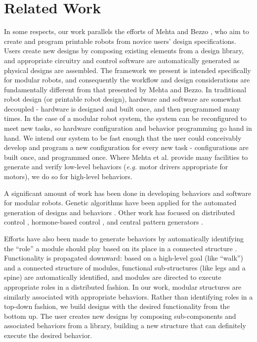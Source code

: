 \documentclass[graybox]{svmult}
\begin{document}
\section{Related Work} \label{sec:related-work} 
In some respects, our work parallels the efforts of Mehta \cite{mehta2014design}
and Bezzo \cite{bezzo2014demo}, who aim to create and program printable robots
from novice users' design specifications.  Users create new designs by composing
existing elements from a design library, and appropriate circuitry and control
software are automatically generated as physical designs are assembled. The
framework we present is intended specifically for modular robots, and
consequently the workflow and design considerations are fundamentally different
from that presented by Mehta and Bezzo.  In traditional robot design (or
printable robot design), hardware and software are somewhat decoupled - hardware
is designed and built once, and then programmed many times.  In the case of a
modular robot system, the system can be reconfigured to meet new tasks, so
hardware configuration and behavior programming go hand in hand.  We intend our
system to be fast enough that the user could conceivably develop and program a
new configuration for every new task - configurations are built once, and programmed once.
Where Mehta et al. provide many facilities to generate and verify low-level
behaviors (\textit{e.g.} motor drivers appropriate for motors), we do so for
high-level behaviors.

A significant amount of work has been done in developing behaviors and software
for modular robots. Genetic algorithms
have been applied for the automated generation of designs and behaviors
\cite{hornby2003generative}. Other work has focused on distributed control
\cite{walter2002choosing}, hormone-based control \cite{salemi2001hormone}, and
central pattern generators \cite{sproewitz2008learning}.

Efforts have also been made to generate behaviors by automatically identifying the ``role'' a module should play based on its place in a connected structure \cite{stoy2002using}.  Functionality is propagated downward: based on a high-level goal (like ``walk'') and a connected structure of modules, functional sub-structures (like legs and a spine) are automatically identified, and modules are directed to execute appropriate roles in a distributed fashion.  In our work, modular structures are similarly associated with appropriate behaviors. Rather than identifying roles in a top-down fashion, we build designs with the desired functionality from the bottom up. The user creates new designs by composing sub-components and associated behaviors from a library, building a new structure that can definitely execute the desired behavior.
\end{document}
